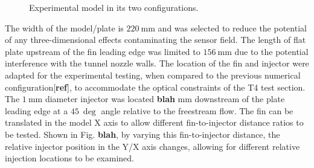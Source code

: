 \documentclass{AIAA}
\begin{document}


%
\begin{figure}[!h]
\center
{}
\caption{Experimental model in its two configurations.}
\label{fig:ModelPics}
\end{figure} 


The width of the model/plate is $\SI{220}{\milli\meter}$ and was selected to reduce the potential of any three-dimensional effects contaminating the sensor field.
The length of flat plate upstream of the fin leading edge was limited to $\SI{156}{\milli\meter}$ due to the potential interference with the tunnel nozzle walls.
The location of the fin and injector were adapted for the experimental testing, when compared to the previous numerical configuration[\textbf{ref}], to accommodate the optical constraints of the T4 test section.
The $\SI{1}{\milli\meter}$ diameter injector was located \textbf{blah} mm downstream of the plate leading edge at a $\SI{45}{\deg}$ angle relative to the freestream flow.
The fin can be translated in the model X axis to allow different fin-to-injector distance ratios to be tested.
Shown in Fig. \textbf{blah}, by varying this fin-to-injector distance, the relative injector position in the Y/X axis changes, allowing for different relative injection locations to be examined. 
\end{document}
